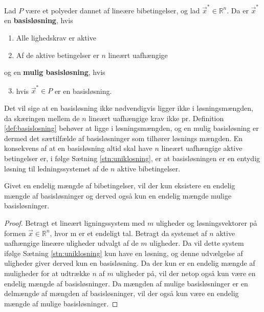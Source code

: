 \begin{defn}
Lad $P$ være et polyeder dannet af lineære bibetingelser, og lad $\vec{x}^*\in \mathds{R}^n$. Da er $\vec{x}^*$ en \textbf{basisløsning}, hvis
\begin{enumerate}[label=(\alph*)]
\item Alle lighedskrav er aktive
\item Af de aktive betingelser er $n$ lineært uafhængige
\end{enumerate}
og en \textbf{mulig basisløsning}, hvis
\begin{enumerate}[label=(\alph*)]
\setcounter{enumi}{2}
\item hvis $\vec{x}^* \in P$ er en basisløsning.
\end{enumerate}
\label{def:basislosning}
\end{defn}
Det vil sige at en basisløsning ikke nødvendigvis ligger ikke i løsningsmængden, da skæringen mellem de $n$ lineært uafhængige krav ikke pr. Definition \ref{def:basislosning} behøver at ligge i løsningsmængden, og en mulig basisløsning er dermed det særtilfælde af basisløsninger som tilhører løsnings mængden.
En konsekvens af at en basisløsning altid skal have $n$ lineært uafhængige aktive betingelser er, i følge Sætning \ref{stn:uniklosning}, er at basisløsningen er en entydig løsning til ledningssystemet af de $n$ aktive bibetingelser.

\begin{kor}
Givet en endelig mængde af bibetingelser, vil der kun eksistere en endelig mængde af basisløsninger og derved også kun en endelig mængde mulige basisløsninger.
\label{kor:endeligbasis}
\end{kor}

\begin{proof}
Betragt et lineært ligningssystem med $m$ uligheder og løsningsvektorer på formen $\vec{x} \in \mathds{R}^n$, hvor m er et endeligt tal.
	Betragt da systemet af $n$ aktive uafhængige lineære uligheder udvalgt af de $m$ uligheder. Da vil dette system ifølge Sætning \ref{stn:uniklosning} kun have en løsning, og denne udvælgelse af uligheder giver derved kun en basisløsning. Da der kun er en endelig mængde af muligheder for at udtrække $n$ af $m$ uligheder på, vil der netop også kun være en endelig mængde af basisløsninger. Da mængden af mulige basisløsninger er en delmængde af mængden af basisløsninger, vil der også kun være en endelig mængde af mulige basisløsninger.
\end{proof}

